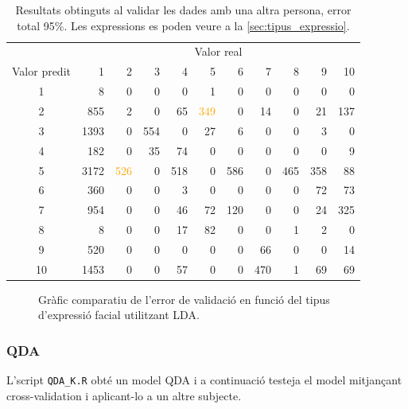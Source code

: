 \documentclass[a4paper]{article}
\begin{document}
\begin{table}[H]
	\centering
	\def\arraystretch{1.2}
	\begin{tabular}{|c|rrrrrrrrrr|}
		\hline
		& \multicolumn{10}{c|}{Valor real} \\
		Valor predit & 1 & 2 & 3 & 4 & 5 & 6 & 7 & 8 & 9 & 10 \\
		\hline
		1 & 8 & 0 & 0 & 0 & 1 & 0 & 0 & 0 & 0 & 0\\
		2 & 855 & 2 & 0 & 65 & \textcolor{Orange}{349} & 0 & 14 & 0 & 21 & 137\\
		3 & 1393 & 0 & 554 & 0 & 27 & 6 & 0 & 0 & 3 & 0\\
		4 & 182 & 0 & 35 & 74 & 0 & 0 & 0 & 0 & 0 & 9\\
		5 & 3172 & \textcolor{Orange}{526} & 0 & 518 & 0 & 586 & 0 & 465 & 358 & 88\\
		6 & 360 & 0 & 0 & 3 & 0 & 0 & 0 & 0 & 72 & 73\\
		7 & 954 & 0 & 0 & 46 & 72 & 120 & 0 & 0 & 24 & 325\\
		8 & 8 & 0 & 0 & 17 & 82 & 0 & 0 & 1 & 2 & 0\\
		9 & 520 & 0 & 0 & 0 & 0 & 0 & 66 & 0 & 0 & 14\\
		10 & 1453 & 0 & 0 & 57 & 0 & 0 & 470 & 1 & 69 & 69\\
		\hline
	\end{tabular}
\captionsetup{width=0.8\textwidth}
	\caption{Resultats obtinguts al validar les dades amb una altra persona, error total 95\%. Les expressions es poden veure a la \autoref{sec:tipus_expressio}.}
\end{table}

\begin{figure}[H]
	\centering
	\captionsetup{width=0.8\textwidth}
	\caption{Gràfic comparatiu de l'error de validació en funció del tipus d'expressió facial utilitzant LDA.}
\end{figure}

\subsubsection{QDA}
L’script \verb|QDA_K.R|  obté un model QDA i a continuació testeja el model mitjançant cross-validation i aplicant-lo a un altre subjecte.
\end{document}
